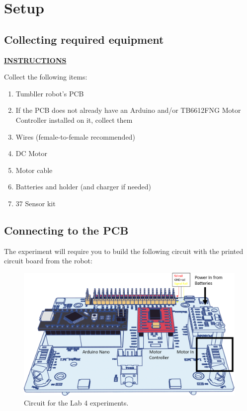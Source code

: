 \documentclass[12pt]{article}
\begin{document}
\section{Setup}

\subsection{Collecting required equipment}

\textbf{\underline{INSTRUCTIONS}}

Collect the following items:
    \begin{enumerate}
        \item Tumbller robot's PCB
        \item If the PCB does not already have an Arduino and/or TB6612FNG Motor Controller installed on it, collect them
        \item Wires (female-to-female recommended)
        \item DC Motor
        \item Motor cable
        \item Batteries and holder (and charger if needed)
        \item 37 Sensor kit
    \end{enumerate}
 \subsection{Connecting to the PCB}
The experiment will require you to build the following circuit with the printed circuit board from the robot:

\begin{figure}[H]
    \centering
    \includegraphics[width=14cm]{photos/lab/pcb.png}
    \caption{Circuit for the Lab 4 experiments.}
\end{figure}
\end{document}
